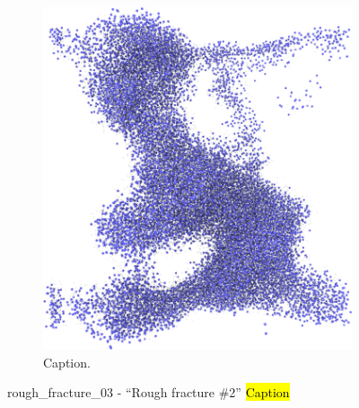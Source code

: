 \begin{figure}[htpb]
\begin{subfigure}[b]{\myfigwidth}
        \includegraphics[width=\textwidth]{images/systems/trimmed-rough_fracture03_08}%
        \caption{Caption.}%
    \end{subfigure}%
    \caption{%
        rough\_fracture\_03 - ``Rough fracture \#2'' \hl{Caption} %
        \label{fig:renderings_rough_fracture03}%
    }%
\end{figure}%

